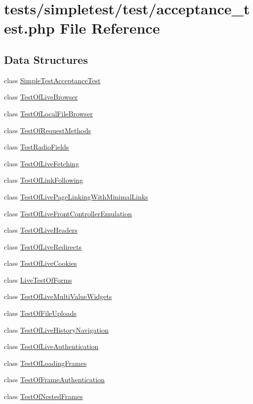 \hypertarget{acceptance__test_8php}{\section{tests/simpletest/test/acceptance\-\_\-test.php File Reference}
\label{acceptance__test_8php}
}
\subsection*{Data Structures}
\begin{DoxyCompactItemize}
\item 
class \hyperlink{class_simple_test_acceptance_test}{Simple\-Test\-Acceptance\-Test}
\item 
class \hyperlink{class_test_of_live_browser}{Test\-Of\-Live\-Browser}
\item 
class \hyperlink{class_test_of_local_file_browser}{Test\-Of\-Local\-File\-Browser}
\item 
class \hyperlink{class_test_of_request_methods}{Test\-Of\-Request\-Methods}
\item 
class \hyperlink{class_test_radio_fields}{Test\-Radio\-Fields}
\item 
class \hyperlink{class_test_of_live_fetching}{Test\-Of\-Live\-Fetching}
\item 
class \hyperlink{class_test_of_link_following}{Test\-Of\-Link\-Following}
\item 
class \hyperlink{class_test_of_live_page_linking_with_minimal_links}{Test\-Of\-Live\-Page\-Linking\-With\-Minimal\-Links}
\item 
class \hyperlink{class_test_of_live_front_controller_emulation}{Test\-Of\-Live\-Front\-Controller\-Emulation}
\item 
class \hyperlink{class_test_of_live_headers}{Test\-Of\-Live\-Headers}
\item 
class \hyperlink{class_test_of_live_redirects}{Test\-Of\-Live\-Redirects}
\item 
class \hyperlink{class_test_of_live_cookies}{Test\-Of\-Live\-Cookies}
\item 
class \hyperlink{class_live_test_of_forms}{Live\-Test\-Of\-Forms}
\item 
class \hyperlink{class_test_of_live_multi_value_widgets}{Test\-Of\-Live\-Multi\-Value\-Widgets}
\item 
class \hyperlink{class_test_of_file_uploads}{Test\-Of\-File\-Uploads}
\item 
class \hyperlink{class_test_of_live_history_navigation}{Test\-Of\-Live\-History\-Navigation}
\item 
class \hyperlink{class_test_of_live_authentication}{Test\-Of\-Live\-Authentication}
\item 
class \hyperlink{class_test_of_loading_frames}{Test\-Of\-Loading\-Frames}
\item 
class \hyperlink{class_test_of_frame_authentication}{Test\-Of\-Frame\-Authentication}
\item 
class \hyperlink{class_test_of_nested_frames}{Test\-Of\-Nested\-Frames}
\end{DoxyCompactItemize}
